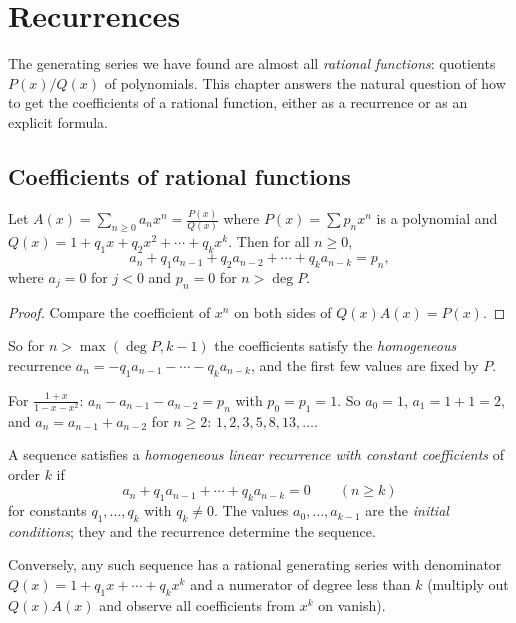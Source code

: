 \chapter{Recurrences}

The generating series we have found are almost all \emph{rational functions}: quotients
$P(x)/Q(x)$ of polynomials. This chapter answers the natural question of how to get the
coefficients of a rational function, either as a recurrence or as an explicit formula.

\section{Coefficients of rational functions}

\begin{theorem}
Let $A(x) = \sum_{n\ge0} a_nx^n = \frac{P(x)}{Q(x)}$ where $P(x) = \sum p_nx^n$ is a polynomial and
$Q(x) = 1 + q_1x + q_2x^2 + \cdots + q_kx^k$. Then for all $n \ge 0$,
\[
a_n + q_1a_{n-1} + q_2a_{n-2} + \cdots + q_ka_{n-k} = p_n,
\]
where $a_j = 0$ for $j < 0$ and $p_n = 0$ for $n > \deg P$.
\end{theorem}
\begin{proof}
Compare the coefficient of $x^n$ on both sides of $Q(x)A(x) = P(x)$.
\end{proof}

So for $n > \max(\deg P, k-1)$ the coefficients satisfy the \emph{homogeneous} recurrence
$a_n = -q_1a_{n-1} - \cdots - q_ka_{n-k}$, and the first few values are fixed by $P$.

\begin{example}
For $\frac{1+x}{1-x-x^2}$: $a_n - a_{n-1} - a_{n-2} = p_n$ with $p_0 = p_1 = 1$. So $a_0 = 1$,
$a_1 = 1 + 1 = 2$, and $a_n = a_{n-1} + a_{n-2}$ for $n\ge2$: $1, 2, 3, 5, 8, 13,\dots$.
\end{example}

\begin{definition}
A sequence satisfies a \emph{homogeneous linear recurrence with constant coefficients} of order
$k$ if
\[
a_n + q_1a_{n-1} + \cdots + q_ka_{n-k} = 0 \qquad (n \ge k)
\]
for constants $q_1,\dots,q_k$ with $q_k \ne 0$. The values $a_0,\dots,a_{k-1}$ are the
\emph{initial conditions}; they and the recurrence determine the sequence.
\end{definition}

Conversely, any such sequence has a rational generating series with denominator
$Q(x) = 1 + q_1x+\cdots+q_kx^k$ and a numerator of degree less than $k$ (multiply out
$Q(x)A(x)$ and observe all coefficients from $x^k$ on vanish).

